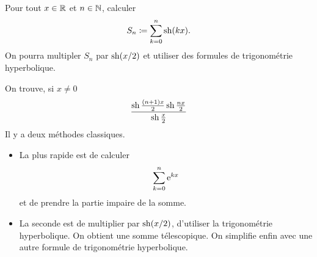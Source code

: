 \documentclass{magnoliaold}
\begin{document}
\begin{exoUnique}
\exemple Pour tout $x\in\mathbb{R}$ et $n\in\mathbb{N}$, calculer
  \[S_n\coloneqq\sum_{k=0}^n \operatorname{sh}(kx).\]
  On pourra multipler $S_n$ par $\operatorname{sh}(x/2)$ et utiliser des formules de trigonométrie
  hyperbolique.
  \begin{sol}
  On trouve, si $x\neq 0$
  \[\frac{\operatorname{sh}\frac{(n+1)x}{2}\operatorname{sh}\frac{nx}{2}}{\operatorname{sh}\frac{x}{2}}\]
  Il y a deux méthodes classiques.
  \begin{itemize}
\item La plus rapide est de calculer
  \[\sum_{k=0}^n {\rm e}^{kx}\]
  et de prendre la partie impaire de la somme.
\item La seconde est de multiplier par $\operatorname{sh}(x/2)$, d'utiliser la trigonométrie hyperbolique. On obtient une somme télescopique. On simplifie enfin avec une autre formule de trigonométrie hyperbolique.
  \end{itemize}
  \end{sol}
\end{exoUnique}
\end{document}
